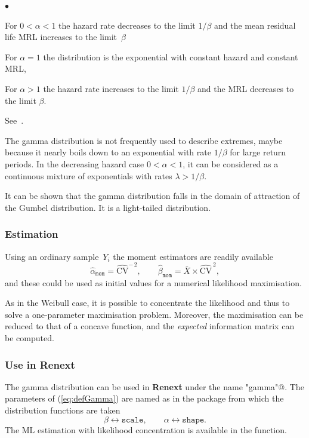 \documentclass[a4paper]{report}
\newcommand{\pkg}[1]{\textbf{#1}}
\begin{document}
\begin{list}{$\bullet$}{\setlength{\itemsep}{2pt}\setlength{\topsep}{2pt}}

\item For $0 < \alpha < 1$ the hazard rate decreases to the limit
  $1/\beta$ and the mean residual life MRL increases to the limit~$\beta$

\item For $\alpha=1$ the distribution is the exponential with constant
  hazard and constant MRL,

\item For $\alpha>1$ the hazard rate increases to the limit $1/\beta$
  and the MRL decreases to the limit $\beta$.

\end{list}
See~\cite{BAGNOLIBERGSTROM}.

The gamma distribution is not frequently used to describe extremes,
maybe because it nearly boils down to an exponential with rate $1/\beta$ for
large return periods. In the decreasing hazard case $0 < \alpha < 1$,
it can be considered as a continuous mixture of exponentials with
rates $\lambda > 1/\beta$. 

It can be shown that the gamma distribution falls in the domain of
attraction of the Gumbel distribution.  It is a light-tailed
distribution.

\subsubsection{Estimation}
Using an ordinary sample~$Y_i$ the moment estimators are readily available
$$
   \widehat{\alpha}_{\texttt{mom}} = \widehat{\textrm{CV}}^{-\,2}, \qquad
   \widehat{\beta}_{\texttt{mom}} = \bar{X}\times \widehat{\textrm{CV}}^{\,2},
$$
%
and these could be used as initial values for a numerical likelihood maximisation. 

As in the Weibull case, it is possible to concentrate
the likelihood and thus to solve a one-parameter maximisation
problem. Moreover, the maximisation can be reduced to that of a concave 
function, and the \textit{expected} information matrix can be computed. 
%

\subsubsection*{Use in Renext}
The gamma distribution  can be used in \pkg{Renext} under the name \verb@"gamma"@. The 
parameters of (\ref{eq:defGamma}) are named as in the \verb@stats@ package from
which the distribution functions are taken
$$
   \beta \leftrightarrow \texttt{scale}, \qquad \alpha \leftrightarrow \texttt{shape}.
$$
The ML estimation with likelihood concentration is available in the 
\verb@fgamma@ function.
\end{document}
